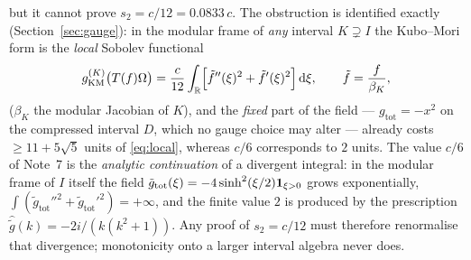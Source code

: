 \documentclass[11pt]{article}
\newcommand{\gtot}{g_{\mathrm{tot}}}\newcommand{\ktil}{\tilde k}
\newcommand{\gKM}{g_{\mathrm{KM}}}\newcommand{\gB}{g_{\mathrm B}}
\begin{document}
but it cannot prove $s_2=c/12=0.0833\,c$.  The obstruction is identified exactly
(Section~\ref{sec:gauge}): in the modular frame of \emph{any} interval $K\supsetneq I$ the Kubo--Mori form is
the \emph{local} Sobolev functional
\begin{equation}\label{eq:local}
 \gKM^{(K)}\bigl(T(f)\Om\bigr)=\frac c{12}\int_{\mathbb R}\Bigl[\tilde f''(\xi)^2+\tilde f'(\xi)^2\Bigr]\dd\xi ,
 \qquad \tilde f=\frac{f}{\beta_K},
\end{equation}
($\beta_K$ the modular Jacobian of $K$), and the \emph{fixed} part of the field --- $\gtot=-x^2$ on the
compressed interval $D$, which no gauge choice may alter --- already costs $\ge11+5\sqrt5$ units of
\eqref{eq:local}, whereas $c/6$ corresponds to $2$ units.  The value $c/6$ of Note~7 is the
\emph{analytic continuation} of a divergent integral: in the modular frame of $I$ itself the field
$\tilde\gtot(\xi)=-4\sinh^2(\xi/2)\one_{\xi>0}$ grows exponentially, $\int(\tilde\gtot''^2+\tilde\gtot'^2)=+\infty$,
and the finite value $2$ is produced by the prescription $\hat{\tilde g}(k)=-2i/(k(k^2+1))$.  Any proof of
$s_2=c/12$ must therefore renormalise that divergence; monotonicity onto a larger interval algebra never does.
\end{document}
